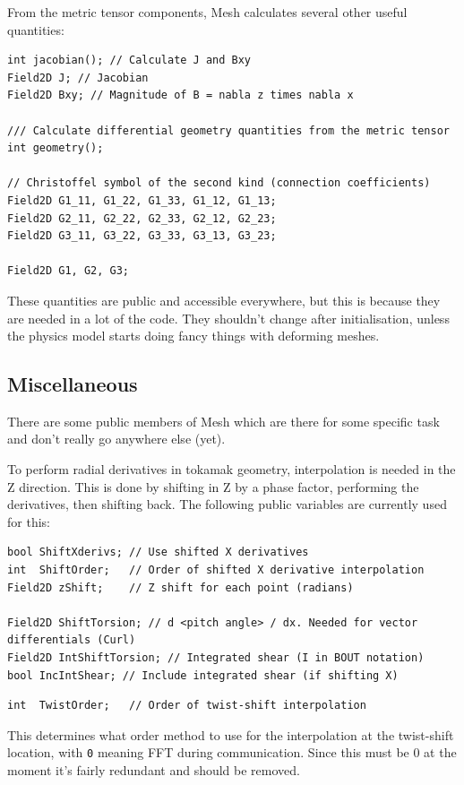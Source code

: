 \documentclass[12pt]{article}
\newcommand{\code}[1]{\texttt{#1}}
\begin{document}
From the metric tensor components, Mesh calculates several other useful
quantities:
\begin{lstlisting}
int jacobian(); // Calculate J and Bxy
Field2D J; // Jacobian
Field2D Bxy; // Magnitude of B = nabla z times nabla x

/// Calculate differential geometry quantities from the metric tensor
int geometry();

// Christoffel symbol of the second kind (connection coefficients)
Field2D G1_11, G1_22, G1_33, G1_12, G1_13;
Field2D G2_11, G2_22, G2_33, G2_12, G2_23;
Field2D G3_11, G3_22, G3_33, G3_13, G3_23;
  
Field2D G1, G2, G3;
\end{lstlisting}

These quantities are public and accessible everywhere, but this is because
they are needed in a lot of the code. They shouldn't change
after initialisation, unless the physics model starts doing fancy things with
deforming meshes.

\subsection{Miscellaneous}

There are some public members of Mesh which are there for some specific
task and don't really go anywhere else (yet). 

To perform radial derivatives in tokamak geometry, interpolation is needed
in the Z direction. This is done by shifting in Z by a phase factor, performing
the derivatives, then shifting back. The following public variables are currently
used for this:
\begin{lstlisting}
bool ShiftXderivs; // Use shifted X derivatives
int  ShiftOrder;   // Order of shifted X derivative interpolation
Field2D zShift;    // Z shift for each point (radians)
  
Field2D ShiftTorsion; // d <pitch angle> / dx. Needed for vector differentials (Curl)
Field2D IntShiftTorsion; // Integrated shear (I in BOUT notation)
bool IncIntShear; // Include integrated shear (if shifting X)
\end{lstlisting}

\begin{lstlisting}
int  TwistOrder;   // Order of twist-shift interpolation
\end{lstlisting}
This determines what order method to use for the interpolation at the twist-shift
location, with \code{0} meaning FFT during communication. Since this must be 0 at the moment
it's fairly redundant and should be removed.
\end{document}
